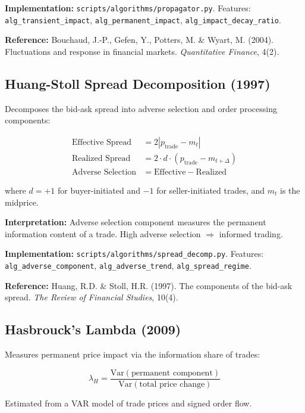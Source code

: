 \documentclass[11pt,a4paper]{article}
\begin{document}
\textbf{Implementation:} \texttt{scripts/algorithms/propagator.py}. Features: \texttt{alg\_transient\_impact}, \texttt{alg\_permanent\_impact}, \texttt{alg\_impact\_decay\_ratio}.

\textbf{Reference:} Bouchaud, J.-P., Gefen, Y., Potters, M. \& Wyart, M. (2004). Fluctuations and response in financial markets. \textit{Quantitative Finance}, 4(2).

\subsection{Huang-Stoll Spread Decomposition (1997)}

Decomposes the bid-ask spread into adverse selection and order processing components:

\begin{align}
\text{Effective Spread} &= 2 |p_{\text{trade}} - m_t| \\
\text{Realized Spread} &= 2 \cdot d \cdot (p_{\text{trade}} - m_{t+\Delta}) \\
\text{Adverse Selection} &= \text{Effective} - \text{Realized}
\end{align}

where $d = +1$ for buyer-initiated and $-1$ for seller-initiated trades, and $m_t$ is the midprice.

\textbf{Interpretation:} Adverse selection component measures the permanent information content of a trade. High adverse selection $\Rightarrow$ informed trading.

\textbf{Implementation:} \texttt{scripts/algorithms/spread\_decomp.py}. Features: \texttt{alg\_adverse\_component}, \texttt{alg\_adverse\_trend}, \texttt{alg\_spread\_regime}.

\textbf{Reference:} Huang, R.D. \& Stoll, H.R. (1997). The components of the bid-ask spread. \textit{The Review of Financial Studies}, 10(4).

\subsection{Hasbrouck's Lambda (2009)}

Measures permanent price impact via the information share of trades:

\begin{equation}
\lambda_H = \frac{\text{Var}(\text{permanent component})}{\text{Var}(\text{total price change})}
\end{equation}

Estimated from a VAR model of trade prices and signed order flow.
\end{document}
